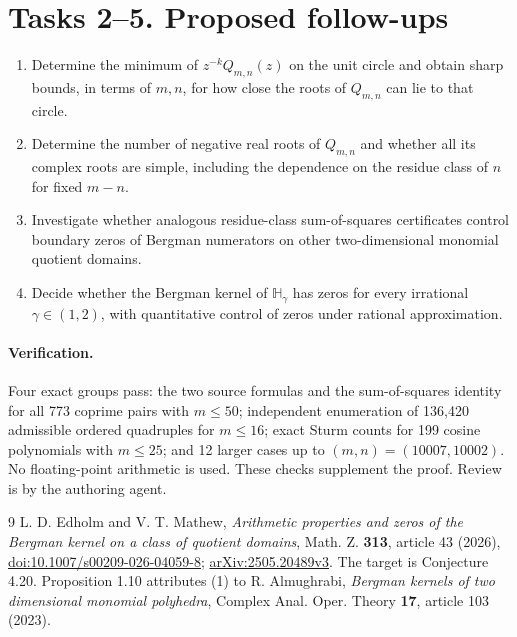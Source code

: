 \documentclass[11pt]{article}
\begin{document}
\section*{Tasks 2--5. Proposed follow-ups}
\begin{enumerate}[label=\textbf{Task \arabic*.},start=2,leftmargin=*]
\item Determine the minimum of $z^{-k}Q_{m,n}(z)$ on the unit
circle and obtain sharp bounds, in terms of $m,n$, for how close
the roots of $Q_{m,n}$ can lie to that circle.
\item Determine the number of negative real roots of $Q_{m,n}$
and whether all its complex roots are simple, including the
dependence on the residue class of $n$ for fixed $m-n$.
\item Investigate whether analogous residue-class sum-of-squares
certificates control boundary zeros of Bergman numerators on other
two-dimensional monomial quotient domains.
\item Decide whether the Bergman kernel of $\mathbb H_\gamma$ has
zeros for every irrational $\gamma\in(1,2)$, with quantitative
control of zeros under rational approximation.
\end{enumerate}

\paragraph{Verification.}
Four exact groups pass: the two source formulas and the sum-of-squares
identity for all 773 coprime pairs with $m\le50$; independent enumeration
of 136,420 admissible ordered quadruples for $m\le16$; exact Sturm
counts for 199 cosine polynomials with $m\le25$; and 12 larger cases
up to $(m,n)=(10007,10002)$. No floating-point arithmetic is used.
These checks supplement the proof. Review is by the authoring agent.

\begin{thebibliography}{9}
 L. D. Edholm and V. T. Mathew,
\emph{Arithmetic properties and zeros of the Bergman kernel on a
class of quotient domains}, Math. Z. \textbf{313}, article 43 (2026),
\href{https://doi.org/10.1007/s00209-026-04059-8}{doi:10.1007/s00209-026-04059-8};
\href{https://arxiv.org/abs/2505.20489}{arXiv:2505.20489v3}.
The target is Conjecture 4.20. Proposition 1.10 attributes (1) to
R. Almughrabi, \emph{Bergman kernels of two dimensional monomial
polyhedra}, Complex Anal. Oper. Theory \textbf{17}, article 103 (2023).
\end{thebibliography}
\end{document}
